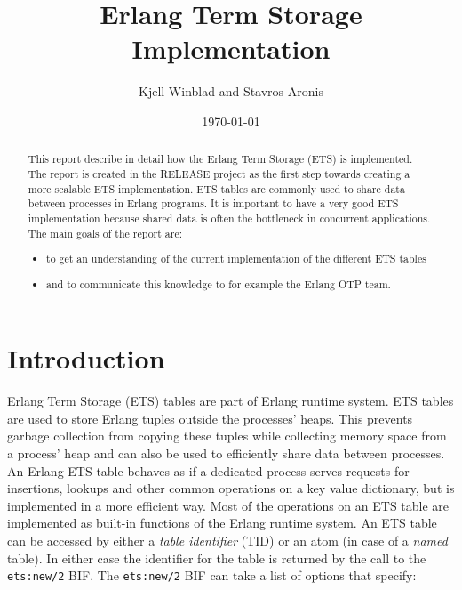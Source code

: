 \documentclass[aps,pre,preprint,nofootinbib]{revtex4}
\begin{document}
\title{Erlang Term Storage Implementation}
\author{Kjell Winblad and Stavros Aronis}
\date{\today}


\begin{abstract}

  This report describe in detail how the Erlang Term Storage (ETS) is implemented.
  The report is created in the RELEASE project as the first step towards creating a more scalable ETS implementation.
  ETS tables are commonly used to share data between processes in Erlang programs.
  It is important to have a very good ETS implementation because shared data is often the bottleneck in concurrent applications.
  The main goals of the report are:
  \begin{itemize}
   \item to get an understanding of the current implementation of the different ETS tables
   \item and to communicate this knowledge to for example the Erlang OTP team. 
  \end{itemize}

\end{abstract}

\maketitle

\section{Introduction}

Erlang Term Storage (ETS) tables are part of Erlang runtime system.
ETS tables are used to store Erlang tuples outside the processes' heaps.
This prevents garbage collection from copying these tuples while collecting memory space from a process' heap and can also be used to efficiently share data between processes. 
An Erlang ETS table behaves as if a dedicated process serves requests for insertions, lookups and other common operations on a key value dictionary, but is implemented in a more efficient way.
Most of the operations on an ETS table are implemented as built-in functions of the Erlang runtime system. 
An ETS table can be accessed by either a \emph{table identifier} (TID) or an atom (in case of a \emph{named} table).
In either case the identifier for the table is returned by the call to the \verb|ets:new/2| BIF.
The \verb|ets:new/2| BIF can take a list of options that specify: 
\end{document}
